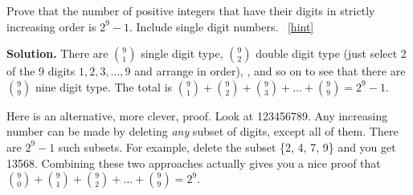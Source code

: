\documentclass{book}
\begin{document}
\setcounter{project}{97}
\addtocounter{project}{-1}
\begin{activity}[]\label{activity-90}
\hypertarget{p-729}{}%
Prove that the number of positive integers that have their digits in strictly increasing order is \(2^{9} - 1\). Include single digit numbers.%
~\hfill{\tiny\hyperlink{a-97}{[hint]}\hypertarget{q-97}{}}\par\smallskip%
\noindent\textbf{Solution.}\hypertarget{solution-71}{}\quad%
\hypertarget{p-731}{}%
There are \(\binom{9}{1}\) single digit type, \(\binom{9}{2}\) double digit type (just select 2 of the 9 digits \(1, 2, 3, \ldots, 9\) and arrange in order), \textellipsis{}, and so on to see that there are \(\binom{9}{9}\) nine digit type. The total is \(\binom{9}{1} + \binom{9}{2} + \binom{9}{3} + \ldots + \binom{9}{9} = 2^{9} - 1\).%
\par
\hypertarget{p-732}{}%
Here is an alternative, more clever, proof. Look at 123456789. Any increasing number can be made by deleting \emph{any} subset of digits, except all of them. There are \(2^{9} - 1\) such subsets. For example, delete the subset \{2, 4, 7, 9\} and you get 13568. Combining these two approaches actually gives you a nice proof that \(\binom{9}{0} + \binom{9}{1} + \binom{9}{2} + \ldots + \binom{9}{9} = 2^{9}\).%
\end{activity}
\end{document}
